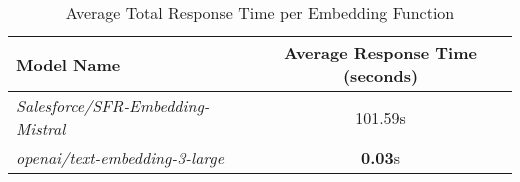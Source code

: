 
\begin{table}[H]
\centering
\begin{tabular}{@{}lc@{}}
\toprule
Model Name & Average Response Time (seconds) \\
\midrule
\textit{Salesforce/SFR-Embedding-Mistral} & 101.59s \\
\textit{openai/text-embedding-3-large} & \textbf{0.03}s \\

\bottomrule
\end{tabular}
\caption{Average Total Response Time per Embedding Function}
\label{tab:average_response_time_embedding_functions}
\end{table}
